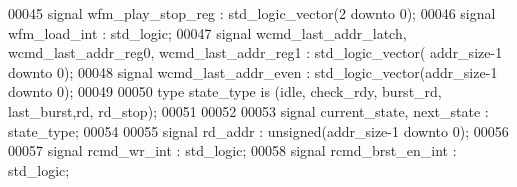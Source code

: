 \begin{DoxyCode}
00045 \textcolor{keywordflow}{signal} \textcolor{vhdlchar}{wfm_play_stop_reg}    \textcolor{vhdlchar}{:} \textcolor{comment}{std\_logic\_vector}\textcolor{vhdlchar}{(}\textcolor{vhdllogic}{}\textcolor{vhdllogic}{2} \textcolor{keywordflow}{downto} \textcolor{vhdllogic}{}\textcolor{vhdllogic}{0}\textcolor{vhdlchar}{)};
00046 \textcolor{keywordflow}{signal} \textcolor{vhdlchar}{wfm_load_int} \textcolor{vhdlchar}{:} \textcolor{comment}{std\_logic};
00047 \textcolor{keywordflow}{signal} \textcolor{vhdlchar}{wcmd_last_addr_latch}\textcolor{vhdlchar}{,}    \textcolor{vhdlchar}{wcmd_last_addr_reg0}\textcolor{vhdlchar}{,} \textcolor{vhdlchar}{wcmd_last_addr_reg1}    \textcolor{vhdlchar}{:} \textcolor{comment}{std\_logic\_vector}\textcolor{vhdlchar}{(}\textcolor{vhdlchar}{
      addr_size}\textcolor{vhdlchar}{-}\textcolor{vhdllogic}{}\textcolor{vhdllogic}{1} \textcolor{keywordflow}{downto} \textcolor{vhdllogic}{}\textcolor{vhdllogic}{0}\textcolor{vhdlchar}{)};
00048 \textcolor{keywordflow}{signal} \textcolor{vhdlchar}{wcmd_last_addr_even} \textcolor{vhdlchar}{:} \textcolor{comment}{std\_logic\_vector}\textcolor{vhdlchar}{(}\textcolor{vhdlchar}{addr_size}\textcolor{vhdlchar}{-}\textcolor{vhdllogic}{}\textcolor{vhdllogic}{1} \textcolor{keywordflow}{downto} \textcolor{vhdllogic}{}\textcolor{vhdllogic}{0}\textcolor{vhdlchar}{)};  
00049 
00050 \textcolor{keywordflow}{type} \textcolor{vhdlchar}{state_type} \textcolor{keywordflow}{is} \textcolor{vhdlchar}{(}\textcolor{vhdlchar}{idle}\textcolor{vhdlchar}{,} \textcolor{vhdlchar}{check\_rdy}\textcolor{vhdlchar}{,} \textcolor{vhdlchar}{burst\_rd}\textcolor{vhdlchar}{,} \textcolor{vhdlchar}{last\_burst}\textcolor{vhdlchar}{,}\textcolor{vhdlchar}{rd}\textcolor{vhdlchar}{,} \textcolor{vhdlchar}{rd\_stop}\textcolor{vhdlchar}{)};
00051 
00052 
00053 \textcolor{keywordflow}{signal} \textcolor{vhdlchar}{current_state}\textcolor{vhdlchar}{,} \textcolor{vhdlchar}{next_state} \textcolor{vhdlchar}{:} \textcolor{vhdlchar}{state_type};
00054 
00055 \textcolor{keywordflow}{signal} \textcolor{vhdlchar}{rd_addr} \textcolor{vhdlchar}{:} \textcolor{comment}{unsigned}\textcolor{vhdlchar}{(}\textcolor{vhdlchar}{addr_size}\textcolor{vhdlchar}{-}\textcolor{vhdllogic}{}\textcolor{vhdllogic}{1} \textcolor{keywordflow}{downto} \textcolor{vhdllogic}{}\textcolor{vhdllogic}{0}\textcolor{vhdlchar}{)};
00056 
00057 \textcolor{keywordflow}{signal} \textcolor{vhdlchar}{rcmd_wr_int} \textcolor{vhdlchar}{:} \textcolor{comment}{std\_logic};
00058 \textcolor{keywordflow}{signal} \textcolor{vhdlchar}{rcmd_brst_en_int} \textcolor{vhdlchar}{:} \textcolor{comment}{std\_logic};

\end{DoxyCode}
